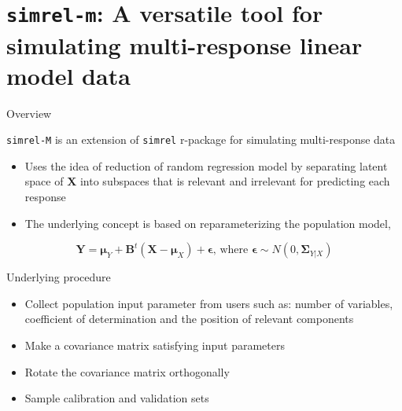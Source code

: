 \documentclass[ignorenonframetext,]{beamer}
\providecommand{\tightlist}{%
\setlength{\itemsep}{0pt}\setlength{\parskip}{0pt}}
\begin{document}
\section{\texorpdfstring{\texttt{simrel-m}: A versatile tool for
simulating multi-response linear model
data}{simrel-m: A versatile tool for simulating multi-response linear model data}}\label{simrel-m-a-versatile-tool-for-simulating-multi-response-linear-model-data}

\begin{frame}[fragile]{Overview}

\pause

\texttt{simrel-M} is an extension of \texttt{simrel}
\citep{saebo2015simrel} r-package for simulating multi-response data

\begin{itemize}
\tightlist
\item
  Uses the idea of reduction of random regression model by separating
  latent space of \(\mathbf{X}\) into subspaces that is relevant and
  irrelevant for predicting each response
\item
  The underlying concept is based on reparameterizing the population
  model,
\end{itemize}

\[
\mathbf{Y} = \boldsymbol{\mu}_{Y} + \mathbf{B}^t\left(\mathbf{X} - \boldsymbol{\mu}_X\right) + \boldsymbol{\epsilon}
\text{, where }\boldsymbol{\epsilon} \sim N(0, \boldsymbol{\Sigma}_{Y|X})
\]

\end{frame}

\begin{frame}{Underlying procedure}

\pause

\hypertarget{left}{}

\hypertarget{right}{}
\begin{itemize}[<+->]
\tightlist
\item
  Collect population input parameter from users such as: number of
  variables, coefficient of determination and the position of relevant
  components
\item
  Make a covariance matrix satisfying input parameters
\item
  Rotate the covariance matrix orthogonally
\item
  Sample calibration and validation sets
\end{itemize}

\end{frame}
\end{document}
